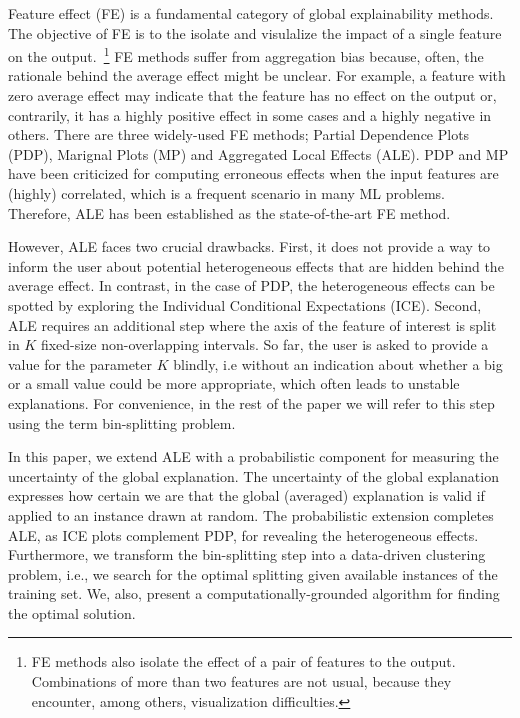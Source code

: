 \documentclass[twoside]{article}
\begin{document}
Feature effect (FE) \citep{Gromping2020MAEP} is a fundamental category
of global explainability methods. The objective of FE is to the
isolate and visulalize the impact of a single feature on the
output.~\footnote{FE methods also isolate the effect of a pair of
  features to the output. Combinations of more than two features are
  not usual, because they encounter, among others, visualization
  difficulties.} FE methods suffer from aggregation bias because,
often, the rationale behind the average effect might be unclear. For
example, a feature with zero average effect may indicate that the
feature has no effect on the output or, contrarily, it has a highly
positive effect in some cases and a highly negative in others. There
are three widely-used FE methods; Partial Dependence Plots
(PDP)\citep{friedman2001greedy}, Marignal Plots
(MP)\citep{apley2020visualizing} and Aggregated Local Effects
(ALE)\citep{apley2020visualizing}. PDP and MP have been criticized for
computing erroneous effects when the input features are (highly)
correlated, which is a frequent scenario in many ML
problems. Therefore, ALE has been established as the state-of-the-art
FE method.

However, ALE faces two crucial drawbacks. First, it does not provide a
way to inform the user about potential heterogeneous effects that are
hidden behind the average effect. In contrast, in the case of PDP, the
heterogeneous effects can be spotted by exploring the Individual
Conditional Expectations (ICE)\citep{goldstein2015peeking}. Second,
ALE requires an additional step where the axis of the feature of
interest is split in \(K\) fixed-size non-overlapping intervals. So
far, the user is asked to provide a value for the parameter \(K\)
blindly, i.e without an indication about whether a big or a small
value could be more appropriate, which often leads to unstable
explanations. For convenience, in the rest of the paper we will refer
to this step using the term bin-splitting problem.

In this paper, we extend ALE with a probabilistic component for
measuring the uncertainty of the global explanation. The uncertainty
of the global explanation expresses how certain we are that the global
(averaged) explanation is valid if applied to an instance drawn at
random. The probabilistic extension completes ALE, as ICE plots
complement PDP, for revealing the heterogeneous effects. Furthermore,
we transform the bin-splitting step into a data-driven clustering
problem, i.e., we search for the optimal splitting given available
instances of the training set. We, also, present a
computationally-grounded algorithm for finding the optimal
solution.
\end{document}
